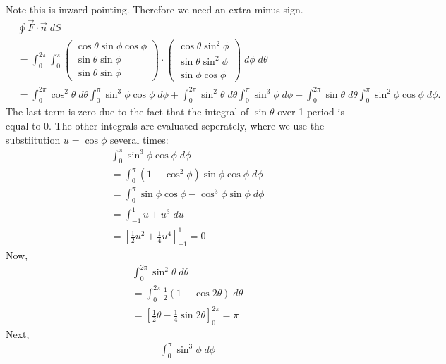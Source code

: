 \documentclass[11pt]{article}
\begin{document}
\begin{solution}
\[    \]
    Note this is inward pointing. Therefore we need an extra minus sign.
    \begin{align*}
        &
        \oint \vec{F}\cdot \vec{n} \;dS
        \\&
        =
        \int_{0}^{2\pi}\int_0^{\pi} \begin{pmatrix}\cos\theta\sin\phi\cos\phi\\ \sin\theta\sin\phi \\ \sin\theta\sin\phi \end{pmatrix}\cdot\begin{pmatrix} \cos\theta\sin^2\phi\\ \sin\theta\sin^2\phi \\\sin\phi\cos\phi \end{pmatrix} \;d\phi\;d\theta
        \\&
        =
        \int_{0}^{2\pi}\cos^2\theta\;d\theta\int_0^{\pi}\sin^3\phi\cos\phi\;d\phi + \int_{0}^{2\pi}\sin^2\theta\;d\theta\int_0^{\pi}\sin^3\phi\;d\phi +  \int_{0}^{2\pi}\sin\theta\;d\theta\int_0^{\pi}\sin^2\phi\cos\phi\;d\phi
        .
    \end{align*}
    The last term is zero due to the fact that the integral of $\sin\theta$ over 1 period is equal to $0$. The other integrals are evaluated seperately, where we use the substiitution $u = \cos\phi$ several times:
    \begin{align*}
        &
        \int_0^{\pi}\sin^3\phi\cos\phi\;d\phi 
        \\&
        = \int_0^{\pi}(1 - \cos^2\phi)\sin\phi\cos\phi\;d\phi 
        \\&
        = \int_0^{\pi}\sin\phi\cos\phi - \cos^3\phi\sin\phi\;d\phi 	
        \\&
        = \int_{-1}^1 u + u^3 \;d u  
        \\&
        = \left[\frac{1}{2} u^2 +\frac{1}{4}u^4\right]_{-1}^{1} = 0
    \end{align*}
    Now, 
    \begin{align*}
        &
        \int_0^{2\pi}\sin^2\theta\;d\theta
        \\&
        = \int_0^{2\pi}\frac{1}{2}(1-\cos2\theta)\;d\theta 
        \\&
        = \left[\frac{1}{2} \theta -\frac{1}{4}\sin2\theta\right]_{0}^{2\pi} = \pi
    \end{align*}
    Next, 
    \begin{align*}
        &
        \int_0^{\pi}\sin^3\phi\;d\phi 
        \\&

\end{align*}
\end{solution}
\end{document}
